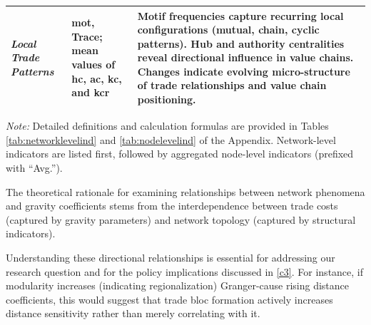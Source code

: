 \documentclass[preprint, 3p,
authoryear]{elsarticle} %
\begin{document}
\begin{table}[H]
\begin{tabular}{@{}p{2.8cm}p{4.5cm}p{7cm}@{}}
\textit{Local Trade Patterns} & 
\gls{mot}, Trace; mean values of \gls{hc}, \gls{ac}, \gls{kc}, and \gls{kcr} & 
Motif frequencies capture recurring local configurations (mutual, chain, cyclic patterns). Hub and authority centralities reveal directional influence in value chains. Changes indicate evolving micro-structure of trade relationships and value chain positioning. \\

\bottomrule
\end{tabular}
\begin{tablenotes}
\scriptsize
\item \textit{Note:} Detailed definitions and calculation formulas are provided in Tables \ref{tab:networklevelind} and \ref{tab:nodelevelind} of the Appendix. Network-level indicators are listed first, followed by aggregated node-level indicators (prefixed with ``Avg.'').
\end{tablenotes}
\end{table}

The theoretical rationale for examining relationships between network
phenomena and gravity coefficients stems from the interdependence
between trade costs (captured by gravity parameters) and network
topology (captured by structural indicators).

Understanding these directional relationships is essential for
addressing our research question and for the policy implications
discussed in \ref{c3}. For instance, if modularity increases (indicating
regionalization) Granger-cause rising distance coefficients, this would
suggest that trade bloc formation actively increases distance
sensitivity rather than merely correlating with it.
\end{document}
